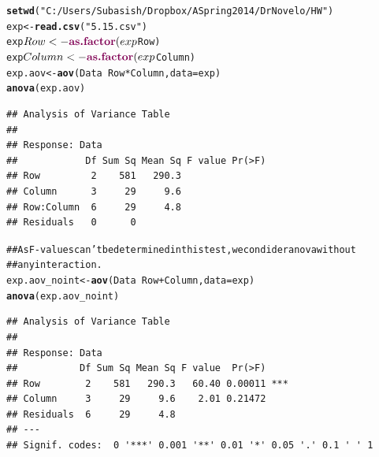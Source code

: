 \documentclass[a4paper]{article}\usepackage{graphicx, color}
\makeatletter
\newcommand{\hlfunctioncall}[1]{\textcolor[rgb]{0.501960784313725,0,0.329411764705882}{\textbf{#1}}}%
\newcommand{\hlstring}[1]{\textcolor[rgb]{0.6,0.6,1}{#1}}%
\newcommand{\hlcomment}[1]{\textcolor[rgb]{0.180392156862745,0.6,0.341176470588235}{#1}}%
\newenvironment{kframe}{%
 \def\at@end@of@kframe{}%
 \ifinner\ifhmode%
  \def\at@end@of@kframe{\end{minipage}}%
  \begin{minipage}{\columnwidth}%
 \fi\fi%
 \def\FrameCommand##1{\hskip\@totalleftmargin \hskip-\fboxsep
 \colorbox{shadecolor}{##1}\hskip-\fboxsep
     \hskip-\linewidth \hskip-\@totalleftmargin \hskip\columnwidth}%
 \MakeFramed {\advance\hsize-\width
   \@totalleftmargin\z@ \linewidth\hsize
   \@setminipage}}%
 {\par\unskip\endMakeFramed%
 \at@end@of@kframe}
\newenvironment{knitrout}{}{} %
\makeatother
\begin{document}
\begin{knitrout}
\color{fgcolor}\begin{kframe}
\begin{alltt}
\hlfunctioncall{setwd}(\hlstring{"C:/Users/Subasish/Dropbox/A Spring 2014/Dr Novelo/HW"})
exp <- \hlfunctioncall{read.csv}(\hlstring{"5.15.csv"})
exp$Row <- \hlfunctioncall{as.factor}(exp$Row)
exp$Column <- \hlfunctioncall{as.factor}(exp$Column)
exp.aov <- \hlfunctioncall{aov}(Data ~ Row * Column, data = exp)
\hlfunctioncall{anova}(exp.aov)
\end{alltt}


{\ttfamily\noindent\color{warningcolor}{\#\# Warning: ANOVA F-tests on an essentially perfect fit are unreliable}}\begin{verbatim}
## Analysis of Variance Table
## 
## Response: Data
##            Df Sum Sq Mean Sq F value Pr(>F)
## Row         2    581   290.3               
## Column      3     29     9.6               
## Row:Column  6     29     4.8               
## Residuals   0      0
\end{verbatim}
\begin{alltt}

\hlcomment{## As F-values can't be determined in this test, we condider anova without}
\hlcomment{## any interaction.}
exp.aov_noint <- \hlfunctioncall{aov}(Data ~ Row + Column, data = exp)
\hlfunctioncall{anova}(exp.aov_noint)
\end{alltt}
\begin{verbatim}
## Analysis of Variance Table
## 
## Response: Data
##           Df Sum Sq Mean Sq F value  Pr(>F)    
## Row        2    581   290.3   60.40 0.00011 ***
## Column     3     29     9.6    2.01 0.21472    
## Residuals  6     29     4.8                    
## ---
## Signif. codes:  0 '***' 0.001 '**' 0.01 '*' 0.05 '.' 0.1 ' ' 1
\end{verbatim}
\end{kframe}
\end{knitrout}
\end{document}
